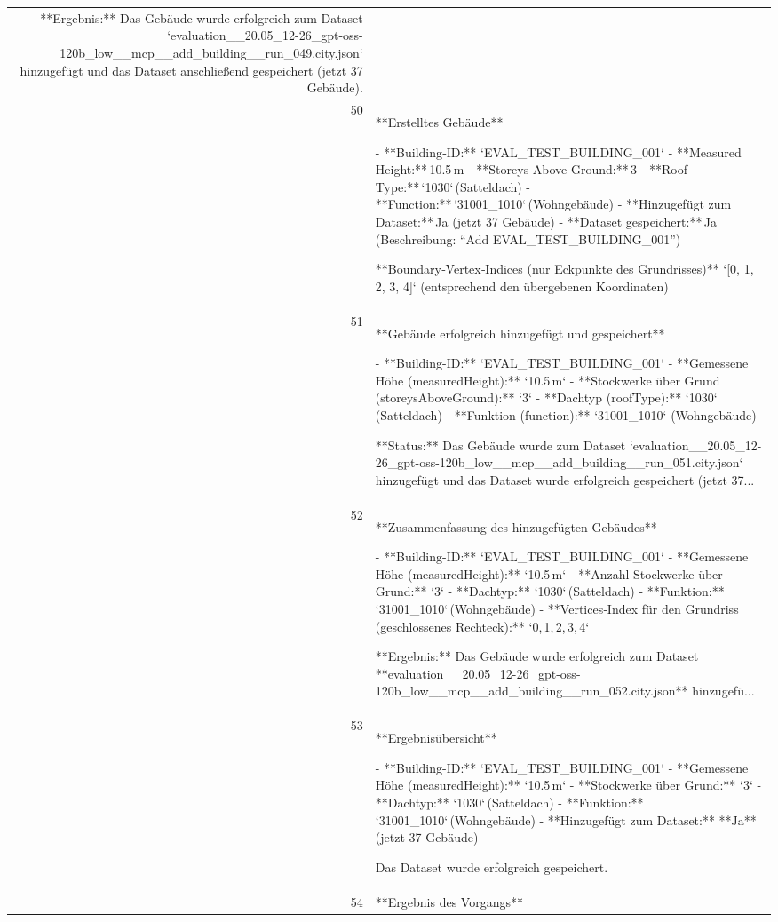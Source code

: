 \documentclass[a4paper,11pt]{article}
\begin{document}
\begin{table}[ht]
\begin{tabular}{r p{12cm}}
**Ergebnis:** Das Gebäude wurde erfolgreich zum Dataset `evaluation\_\_20.05\_12-26\_gpt-oss-120b\_low\_\_mcp\_\_add\_building\_\_run\_049.city.json` hinzugefügt und das Dataset anschließend gespeichert (jetzt 37 Gebäude). \\
50 & **Erstelltes Gebäude**

- **Building‑ID:** `EVAL\_TEST\_BUILDING\_001`  
- **Measured Height:** 10.5 m  
- **Storeys Above Ground:** 3  
- **Roof Type:** `1030` (Satteldach)  
- **Function:** `31001\_1010` (Wohngebäude)  
- **Hinzugefügt zum Dataset:** Ja (jetzt 37 Gebäude)  
- **Dataset gespeichert:** Ja (Beschreibung: “Add EVAL\_TEST\_BUILDING\_001”)  

**Boundary‑Vertex‑Indices (nur Eckpunkte des Grundrisses)**  
`[0, 1, 2, 3, 4]`  (entsprechend den übergebenen Koordinaten)   \\
51 & **Gebäude erfolgreich hinzugefügt und gespeichert**

- **Building-ID:** `EVAL\_TEST\_BUILDING\_001`  
- **Gemessene Höhe (measuredHeight):** `10.5 m`  
- **Stockwerke über Grund (storeysAboveGround):** `3`  
- **Dachtyp (roofType):** `1030` (Satteldach)  
- **Funktion (function):** `31001\_1010` (Wohngebäude)  

**Status:** Das Gebäude wurde zum Dataset `evaluation\_\_20.05\_12-26\_gpt-oss-120b\_low\_\_mcp\_\_add\_building\_\_run\_051.city.json` hinzugefügt und das Dataset wurde erfolgreich gespeichert (jetzt 37... \\
52 & **Zusammenfassung des hinzugefügten Gebäudes**

- **Building-ID:** `EVAL\_TEST\_BUILDING\_001`  
- **Gemessene Höhe (measuredHeight):** `10.5 m`  
- **Anzahl Stockwerke über Grund:** `3`  
- **Dachtyp:** `1030` (Satteldach)  
- **Funktion:** `31001\_1010` (Wohngebäude)  
- **Vertices‑Index für den Grundriss (geschlossenes Rechteck):** `0, 1, 2, 3, 4`  

**Ergebnis:** Das Gebäude wurde erfolgreich zum Dataset **evaluation\_\_20.05\_12-26\_gpt-oss-120b\_low\_\_mcp\_\_add\_building\_\_run\_052.city.json** hinzugefü... \\
53 & **Ergebnisübersicht**

- **Building-ID:** `EVAL\_TEST\_BUILDING\_001`  
- **Gemessene Höhe (measuredHeight):** `10.5 m`  
- **Stockwerke über Grund:** `3`  
- **Dachtyp:** `1030` (Satteldach)  
- **Funktion:** `31001\_1010` (Wohngebäude)  
- **Hinzugefügt zum Dataset:** **Ja** (jetzt 37 Gebäude)  

Das Dataset wurde erfolgreich gespeichert. \\
54 & **Ergebnis des Vorgangs**


\end{tabular}
\end{table}
\end{document}

